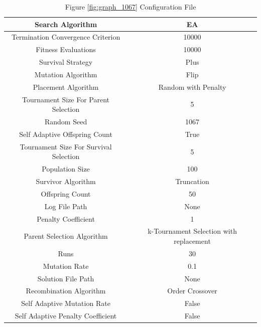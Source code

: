 \documentclass{standalone}
\begin{document}
\begin{table}[!htb]
	\centering
	\caption{Figure \ref{fig:graph_1067} Configuration File}
	\label{tab:graph_1067}
	\begin{tabular}{| c | c |}
		\hline
		Search Algorithm		& EA		 \\
		\hline
		Termination Convergence Criterion		& 10000		 \\
		\hline
		Fitness Evaluations		& 10000		 \\
		\hline
		Survival Strategy		& Plus		 \\
		\hline
		Mutation Algorithm		& Flip		 \\
		\hline
		Placement Algorithm		& Random with Penalty		 \\
		\hline
		Tournament Size For Parent Selection		& 5		 \\
		\hline
		Random Seed		& 1067		 \\
		\hline
		Self Adaptive Offspring Count		& True		 \\
		\hline
		Tournament Size For Survival Selection		& 5		 \\
		\hline
		Population Size		& 100		 \\
		\hline
		Survivor Algorithm		& Truncation		 \\
		\hline
		Offspring Count		& 50		 \\
		\hline
		Log File Path		& None		 \\
		\hline
		Penalty Coefficient		& 1		 \\
		\hline
		Parent Selection Algorithm		& k-Tournament Selection with replacement		 \\
		\hline
		Runs		& 30		 \\
		\hline
		Mutation Rate		& 0.1		 \\
		\hline
		Solution File Path		& None		 \\
		\hline
		Recombination Algorithm		& Order Crossover		 \\
		\hline
		Self Adaptive Mutation Rate		& False		 \\
		\hline
		Self Adaptive Penalty Coefficient		& False		 \\
		\hline
	\end{tabular}
\end{table}
\end{document}
